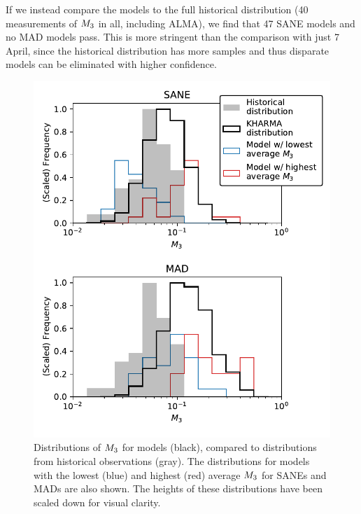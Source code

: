 If we instead compare the models to the full historical distribution (40 measurements of $M_{3}$ in all, including ALMA), we find that 47 SANE models and no MAD models pass. This is more stringent than the comparison with just 7 April, since the historical distribution has more samples and thus disparate models can be eliminated with higher confidence.

\begin{figure}
  \centering
  \includegraphics[width=\columnwidth]{./figures/mi_hist.pdf}
  \caption{Distributions of $M_{3}$ for \kharma models (black), compared to distributions from historical observations (gray). The distributions for models with the lowest (blue) and highest (red) average $M_{3}$ for SANEs and MADs are also shown. The heights of these distributions have been scaled down for visual clarity.
  }
  \label{fig:cmp_ALMA_var}
\end{figure}


